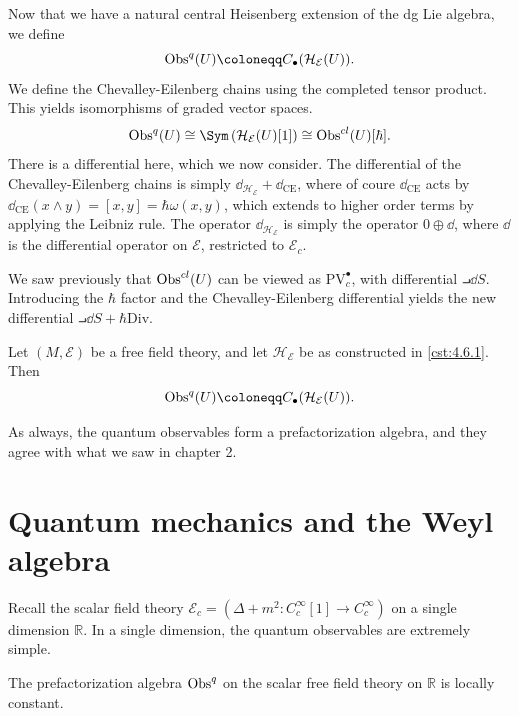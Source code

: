 \begin{construction}
	Now that we have a natural central Heisenberg extension of the dg Lie algebra, we define
	\[
		\Obs^q(U)\coloneqq C_{\bullet} (\mathcal{H} _\mathcal{E} (U))
	.\]
	We define the Chevalley-Eilenberg chains using the completed tensor product. This yields isomorphisms of graded vector spaces.
	\[
		\Obs^q(U)\cong \Sym \left( \mathcal{H} _\mathcal{E} (U)[1] \right) \cong \Obs^{cl} (U)[\hbar ]
	.\]
	There is a differential here, which we now consider. The differential of the Chevalley-Eilenberg chains is simply $\dd _{\mathcal{H} _\mathcal{E} } +\dd _{\mathrm{CE} } $, where of coure $\dd _{\mathrm{CE} } $ acts by $\dd _{\mathrm{CE} } (x\wedge y) = [x,y]=\hbar \omega (x,y)$, which extends to higher order terms by applying the Leibniz rule. The operator $\dd _{\mathcal{H} _\mathcal{E} } $ is simply the operator $0 \oplus \dd $, where $\dd $ is the differential operator on $\mathcal{E} $, restricted to $\mathcal{E} _c$.
\end{construction}

We saw previously that $\operatorname{Obs}^{cl} (U)$ can be viewed as $\mathrm{PV} ^{\bullet} _c$, with differential $\intprod \dd S$. Introducing the $\hbar $ factor and the Chevalley-Eilenberg differential yields the new differential $\intprod \dd S + \hbar \mathrm{Div} $.

\begin{definition}\label{dfn:4.6.2}
	Let $(M,\mathcal{E} )$ be a free field theory, and let $\mathcal{H} _\mathcal{E} $ be as constructed in \cref{cst:4.6.1}. Then
	\[
		\Obs^q(U) \coloneqq C_{\bullet} (\mathcal{H} _\mathcal{E} (U))
	.\]
\end{definition}
As always, the quantum observables form a prefactorization algebra, and they agree with what we saw in chapter 2.









\chapter{Quantum mechanics and the Weyl algebra}


Recall the scalar field theory $\mathcal{E} _c = \left( \Delta +m^2 : C^\infty _c[1] \to C^\infty _c \right) $ on a single dimension $\mathbb{R} $. In a single dimension, the quantum observables are extremely simple.

\begin{lemma}\label{lma:5.0.1}
	The prefactorization algebra $\operatorname{Obs}^q$ on the scalar free field theory on $\mathbb{R} $ is locally constant.
\end{lemma}

